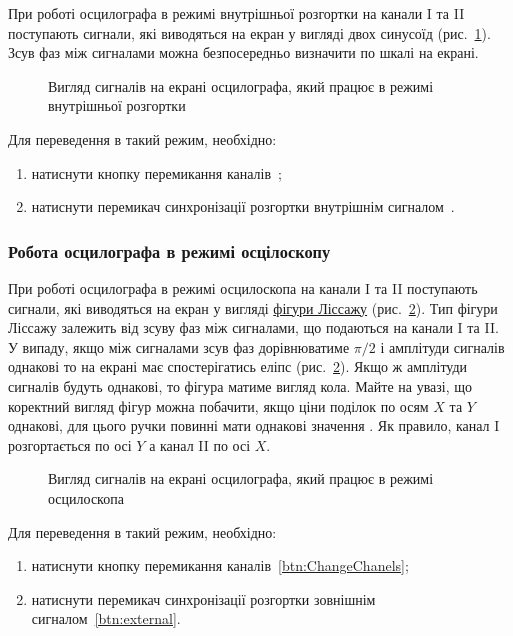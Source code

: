 При роботі осцилографа в режимі внутрішньої розгортки на канали I та II поступають сигнали, які виводяться на екран у вигляді двох синусоїд (рис.~\ref{fig:InternalMode}).  Зсув фаз між сигналами можна безпосередньо визначити по шкалі на екрані.

\begin{figure}[!h]\centering
    
\caption{Вигляд сигналів на екрані осцилографа, який працює в режимі внутрішньої розгортки}
\label{fig:InternalMode}
\end{figure}


Для переведення в такий режим, необхідно:
\begin{enumerate}
\item  натиснути кнопку  \tcbox{\sc{$\rightarrow\rightarrow$}} перемикання каналів~\circled{\ref{btn:ChangeChanels}};
\item  натиснути перемикач  синхронізації розгортки внутрішнім сигналом~\circled{\ref{btn:iternal}}.
\end{enumerate}


\subsubsection*{Робота осцилографа в режимі осцілоскопу}

При роботі осцилографа в режимі осцилоскопа на канали I та II поступають сигнали, які виводяться на екран у вигляді  \href{https://uk.wikipedia.org/wiki/Фігури\_Ліссажу}{фігури Ліссажу} (рис.~\ref{fig:ExternalMode}). Тип фігури Ліссажу залежить від зсуву фаз між сигналами, що подаються на канали I та II. У випаду, якщо між сигналами зсув фаз дорівнюватиме $\pi/2$ і амплітуди сигналів однакові то на екрані має спостерігатись еліпс (рис.~\ref{fig:ExternalMode}). Якщо ж амплітуди сигналів будуть однакові, то фігура матиме вигляд кола. Майте на увазі, що коректний вигляд фігур можна побачити, якщо ціни поділок  по осям $X$ та $Y$ однакові, для цього ручки \circled{\ref{btn:stch}} повинні мати однакові значення . Як правило, канал I розгортається по осі $Y$ а канал II по осі $X$.


\begin{figure}[!h]\centering
    
\caption{Вигляд сигналів на екрані осцилографа, який працює в режимі осцилоскопа}
\label{fig:ExternalMode}
\end{figure}


Для переведення в такий режим, необхідно:
\begin{enumerate}
\item  натиснути кнопку   перемикання каналів~\ref{btn:ChangeChanels};
\item  натиснути перемикач \tcbox{\sc{\inX}} синхронізації розгортки зовнішнім сигналом~\ref{btn:external}.
\end{enumerate}

